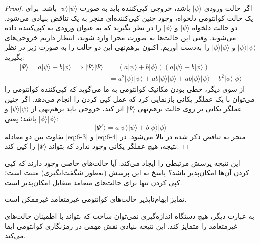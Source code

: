 \begin{proof}
	اگر حالت ورودی $|\psi\rangle$ باشد، خروجی کپی‌کننده باید به صورت $|\psi\rangle|\psi\rangle$ باشد. برای یک حالت کوانتومی دلخواه، وجود چنین کپی‌کننده‌ای منجر به یک تناقض بنیادی می‌شود. دو حالت دلخواه $|\psi\rangle$ و $|\phi\rangle$ را در نظر بگیرید که به عنوان ورودی به کپی‌کننده داده می‌شوند. وقتی این حالت‌ها به صورت مجزا وارد شوند، انتظار داریم خروجی‌های $|\psi\rangle|\psi\rangle$ و $|\phi\rangle|\phi\rangle$ را به‌دست آوریم. اکنون برهم‌نهی این دو حالت را به صورت زیر در نظر بگیرید:
	\begin{equation}
		\begin{aligned}
			|\Psi\rangle = a|\psi\rangle + b|\phi\rangle \implies |\Psi\rangle|\Psi\rangle &= (a|\psi\rangle + b|\phi\rangle)(a|\psi\rangle + b|\phi\rangle) \\ &= a^2|\psi\rangle|\psi\rangle + ab|\psi\rangle|\phi\rangle + ab|\phi\rangle|\psi\rangle + b^2|\phi\rangle|\phi\rangle
		\end{aligned}
		\label{eq:6-3}
	\end{equation}
	از سوی دیگر، خطی بودن مکانیک کوانتومی به ما می‌گوید که کپی‌کننده کوانتومی را می‌توان با یک عملگر یکانی بازنمایی کرد که عمل کپی کردن را انجام می‌دهد. اگر چنین عملگر یکانی بر روی حالت برهم‌نهی $|\Psi\rangle$ اثر کند، خروجی باید برهم‌نهی از $|\psi\rangle|\psi\rangle$ و $|\phi\rangle|\phi\rangle$ باشد؛ یعنی:
	\begin{equation}
		|\Psi'\rangle = a|\psi\rangle|\psi\rangle + b|\phi\rangle|\phi\rangle
		\label{eq:6-4}
	\end{equation}
	تفاوت بین دو معادله \eqref{eq:6-3} و \eqref{eq:6-4} منجر به تناقض ذکر شده در بالا می‌شود. در نتیجه، هیچ عملگر یکانی وجود ندارد که بتواند $|\Psi\rangle$ را کپی کند.
\end{proof}

این نتیجه پرسش مرتبطی را ایجاد می‌کند: آیا حالت‌های خاصی وجود دارند که کپی کردن آن‌ها امکان‌پذیر باشد؟ پاسخ به این پرسش (به‌طور شگفت‌انگیزی) مثبت است؛ کپی کردن تنها برای حالت‌های متعامد متقابل امکان‌پذیر است.

\begin{theorem}
	\label{thm:6-2}
	تمایز ابهام‌ناپذیر حالت‌های کوانتومی غیرمتعامد غیرممکن است.
	
	
	به عبارت دیگر، هیچ دستگاه اندازه‌گیری نمی‌توان ساخت که بتواند با اطمینان حالت‌های غیرمتعامد را متمایز کند. این نتیجه بنیادی نقش مهمی در رمزنگاری کوانتومی ایفا می‌کند.
\end{theorem}

